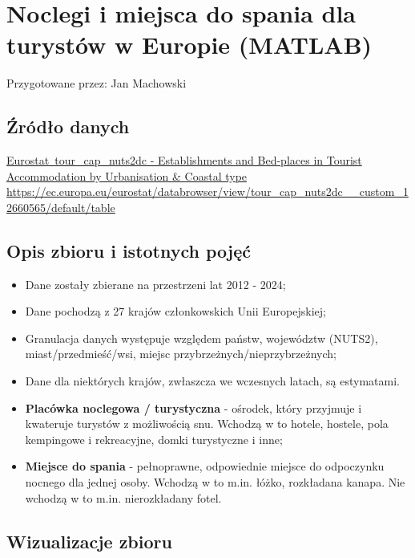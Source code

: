 \documentclass[12pt]{article}
\begin{document}
\newpage
\section{Noclegi i miejsca do spania dla turystów w Europie (MATLAB)}

Przygotowane przez: Jan Machowski

\subsection{Źródło danych}
\href{https://ec.europa.eu/eurostat/databrowser/view/tour_cap_nuts2dc__custom_12660565/default/table}
{Eurostat\ tour\_cap\_nuts2dc - Establishments and Bed-places in Tourist Accommodation by Urbanisation \& Coastal type} \\
\url{https://ec.europa.eu/eurostat/databrowser/view/tour_cap_nuts2dc__custom_12660565/default/table}

\subsection{Opis zbioru i istotnych pojęć}
\begin{itemize}
    \item Dane zostały zbierane na przestrzeni lat 2012 - 2024;
    \item Dane pochodzą z 27 krajów członkowskich Unii Europejskiej;
    \item Granulacja danych występuje względem państw, województw (NUTS2), miast/przedmieść/wsi, miejsc przybrzeżnych/nieprzybrzeżnych;
    \item Dane dla niektórych krajów, zwłaszcza we wczesnych latach, są estymatami.
    \item \textbf{Placówka noclegowa / turystyczna} - ośrodek, który przyjmuje i kwateruje turystów z możliwością snu. 
            Wchodzą w to hotele, hostele, pola kempingowe i rekreacyjne, domki turystyczne i inne;
    \item \textbf{Miejsce do spania} - pełnoprawne, odpowiednie miejsce do odpoczynku nocnego dla jednej osoby.
            Wchodzą w to m.in. łóżko, rozkładana kanapa. Nie wchodzą w to m.in. nierozkładany fotel.
\end{itemize}


\subsection{Wizualizacje zbioru}
\end{document}
